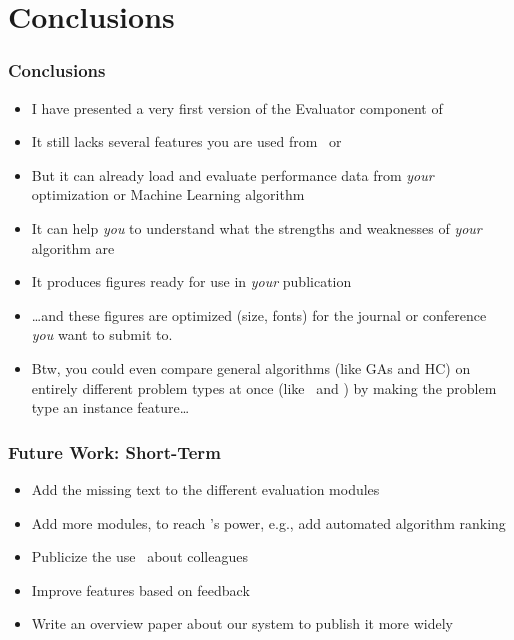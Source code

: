 %
\section{Conclusions}%
%
\begin{frame}%
\frametitle{Conclusions}%
\begin{itemize}%
\item I have presented a very first version of the Evaluator component of \optimizationBenchmarking%
\item<2-> It still lacks several features you are used from \tspSuite\ or \coco%
\item<3-> But it can already load and evaluate performance data from \emph{your} optimization or Machine Learning algorithm%
\item<4-> It can help \emph{you} to understand what the strengths and weaknesses of \emph{your} algorithm are%
\item<5-> It produces figures ready for use in \emph{your} publication%
\item<6-> {\dots}and these figures are optimized (size, fonts) for the journal or conference \emph{you} want to submit to.%
\item<7-> Btw, you could even compare general algorithms (like GAs and HC) on entirely different problem types at once (like \maxSat\ and \bbob) by making the problem type an instance feature\dots%
\end{itemize}%
\end{frame}
%
%
\begin{frame}%
\frametitle{Future Work: Short-Term}%
\begin{itemize}%
\item Add the missing text to the different evaluation modules%
\item<2-> Add more modules, to reach \tspSuite's power, e.g., add automated algorithm ranking%
\item<3-> Publicize the use \optimizationBenchmarking\ about colleagues%
\item<4-> Improve features based on feedback%
\item<5-> Write an overview paper about our system to publish it more widely%
\end{itemize}%
\end{frame}
%
